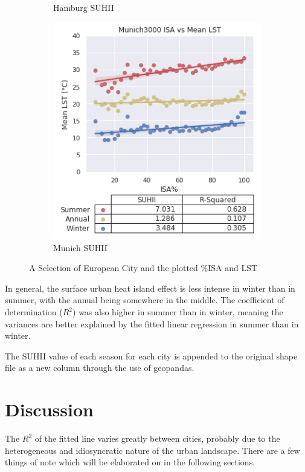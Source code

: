 \documentclass{article}
\begin{document}
\begin{figure}[!htb]
\begin{subfigure}{0.333\textwidth}
        \caption{Hamburg SUHII}
        \label{fig:subim2}
    \end{subfigure}\hfill
    \begin{subfigure}{0.333\textwidth}
        \centering
        \includegraphics[width=1\linewidth]{Munich3000.png}
        \caption{Munich SUHII}
        \label{fig:subim3}
    \end{subfigure}
    \caption{A Selection of European City and the plotted \%ISA and LST}
    \label{fig:my_label}
\end{figure}

In general, the surface urban heat island effect is less intense in winter than in summer, with the annual being somewhere in the middle. The coefficient of determination ($R^2$) was also higher in summer than in winter, meaning the variances are better explained by the fitted linear regression in summer than in winter.

The SUHII value of each season for each city is appended to the original shape file as a new column through the use of geopandas.

\section{Discussion}
The $R^2$ of the fitted line varies greatly between cities, probably due to the heterogeneous and idiosyncratic nature of the urban landscape. There are a few things of note which will be elaborated on in the following sections.
\end{document}
